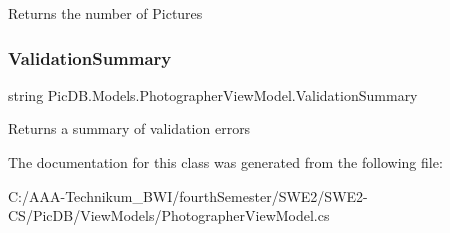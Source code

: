 Returns the number of Pictures 

\mbox{\label{class_pic_d_b_1_1_models_1_1_photographer_view_model_a03e3fe541dbcf267d42c837941109249}} 
\subsubsection{\texorpdfstring{Validation\+Summary}{ValidationSummary}}
{\footnotesize\ttfamily string Pic\+D\+B.\+Models.\+Photographer\+View\+Model.\+Validation\+Summary\hspace{0.3cm}{\ttfamily [get]}}



Returns a summary of validation errors 



The documentation for this class was generated from the following file\+:\begin{DoxyCompactItemize}
\item 
C\+:/\+A\+A\+A-\/\+Technikum\+\_\+\+B\+W\+I/fourth\+Semester/\+S\+W\+E2/\+S\+W\+E2-\/\+C\+S/\+Pic\+D\+B/\+View\+Models/Photographer\+View\+Model.\+cs\end{DoxyCompactItemize}
